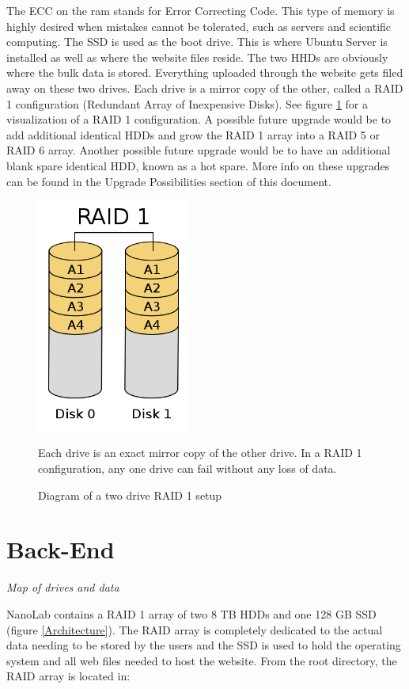\documentclass[titlepage]{article}
\begin{document}
    The ECC on the ram stands for Error Correcting Code. This type of memory is highly desired when mistakes cannot be tolerated, such as servers and scientific computing. The SSD is used as the boot drive. This is where Ubuntu Server is installed as well as where the website files reside. The two HHDs are obviously where the bulk data is stored. Everything uploaded through the website gets filed away on these two drives. Each drive is a mirror copy of the other, called a RAID 1 configuration (Redundant Array of Inexpensive Disks). See figure \ref{RAID1} for a visualization of a RAID 1 configuration. A possible future upgrade would be to add additional identical HDDs and grow the RAID 1 array into a RAID 5 or RAID 6 array. Another possible future upgrade would be to have an additional blank spare identical HDD, known as a hot spare. More info on these upgrades can be found in the Upgrade Possibilities section of this document.

    \begin{figure}[t]
    \centering
    \includegraphics[width=50mm]{RAID1.png}
     \caption{Diagram of a two drive RAID 1 setup}
     \medskip
     \small 
     Each drive is an exact mirror copy of the other drive. In a RAID 1 configuration, any one drive can fail without any loss of data.
     \label{RAID1}
    \end{figure}

\section{Back-End}

    \noindent\textit{Map of drives and data}
    
    NanoLab contains a RAID 1 array of two 8 TB HDDs and one 128 GB SSD (figure \ref{Architecture}). The RAID array is completely dedicated to the actual data needing to be stored by the users and the SSD is used to hold the operating system and all web files needed to host the website. From the root directory, the RAID array is located in:
    
\end{document}
